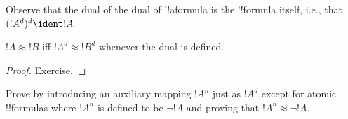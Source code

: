\documentclass[../../../include/open-logic-section]{subfiles}
\begin{document}
Observe that the dual of the dual of !!a{formula} is the !!{formula} itself, i.e., that $(!A^d)^d \ident !A$.

\begin{prop}
$!A \approx !B$ iff $!A^d \approx !B^d$ whenever the dual is defined.
\end{prop}
\begin{proof}
Exercise.
\end{proof}

\begin{prob}
Prove  by introducing an auxiliary mapping $!A^n$ just as $!A^d$ except for atomic !!{formula}s where $!A^n$ is defined to be $\lnot !A$ and proving that $!A^n \approx \lnot !A$.
\end{prob}
\end{document}
